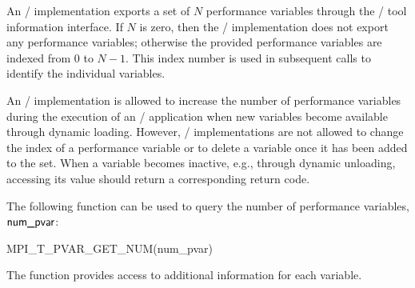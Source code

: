 An \MPI/ implementation exports a set of $N$ performance variables through
the \MPI/ tool information interface.  If $N$ is zero, then the \MPI/
implementation does not export any performance variables; otherwise the
provided performance variables are indexed from $0$ to $N-1$.  This index
number is used in subsequent calls to identify the individual variables.

An \MPI/ implementation is allowed to increase the number of performance
variables during the execution of an \MPI/ application when new variables
become available through dynamic loading.  However, \MPI/ implementations
are not allowed to change the index of a performance variable or to delete
a variable once it has been added to the set.  When a variable becomes
inactive, e.g., through dynamic unloading, accessing its value should
return a corresponding return code.

The following function can be used to query the number of performance
variables, $\mpiarg{num\_pvar}$:

\begin{funcdef}{MPI\_T\_PVAR\_GET\_NUM}{(\mbox{num\_pvar})}
\end{funcdef}

The function  provides access to
additional information for each variable.


